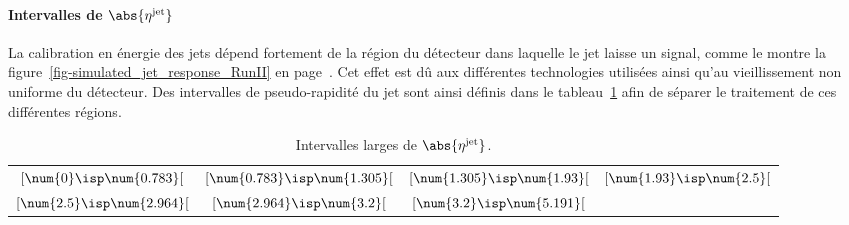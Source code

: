 \paragraph{Intervalles de $\abs{\eta^\text{jet}}$}
La calibration en énergie des jets dépend fortement de la région du détecteur dans laquelle le jet laisse un signal, comme le montre la figure~\ref{fig-simulated_jet_response_RunII} en page~\pageref{fig-simulated_jet_response_RunII}.
Cet effet est dû aux différentes technologies utilisées ainsi qu'au vieillissement non uniforme du détecteur.
Des intervalles de pseudo-rapidité du jet sont ainsi définis dans le tableau~\ref{tab-eta_jet_intervalles_large} afin de séparer le traitement de ces différentes régions.
\begin{table}[h]
\centering
\begin{tabular}{cccc}
\toprule
$[\num{0}\isp \num{0.783}[$ & $[\num{0.783}\isp \num{1.305}[$ & $[\num{1.305}\isp \num{1.93}[$ & $[\num{1.93}\isp \num{2.5}[$ \\
$[\num{2.5}\isp \num{2.964}[$ & $[\num{2.964}\isp \num{3.2}[$ & $[\num{3.2}\isp \num{5.191}[$ &  \\
\bottomrule
\end{tabular}
\caption{Intervalles larges de $\abs{\eta^\text{jet}}$.}
\label{tab-eta_jet_intervalles_large}
\end{table}
